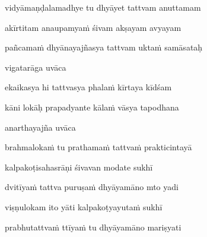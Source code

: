 vidyāmaṇḍalamadhye tu dhyāyet tattvam anuttamam\thinspace{\dandab} \dontdisplaylinenum

akīrtitam anaupamya\.m śivam akṣayam avyayam \danda\dontdisplaylinenum

pañcama\.m dhyānayajñasya tattvam ukta\.m samāsataḥ \veg\dontdisplaylinenum

vigatarāga uvāca~{\dandab}\dontdisplaylinenum 

ekaikasya hi tattvasya phala\.m kīrtaya kīdśam\thinspace{\danda} \dontdisplaylinenum

kāni lokāḥ prapadyante kāla\.m vāsya tapodhana \veg\dontdisplaylinenum

anarthayajña uvāca~{\dandab}\dontdisplaylinenum 

brahmaloka\.m tu prathama\.m tattva\.m prakticintayā\thinspace{\danda} \dontdisplaylinenum

kalpakoṭisahasrāṇi śivavan modate sukhī \veg\dontdisplaylinenum

dvitīya\.m tattva puruṣa\.m dhyāyamāno mto yadi\thinspace{\dandab} \dontdisplaylinenum

viṣṇulokam ito yāti kalpakoṭyayuta\.m sukhī \veg\dontdisplaylinenum

prabhutattva\.m ttīya\.m tu dhyāyamāno mariṣyati\thinspace{\dandab} \dontdisplaylinenum

